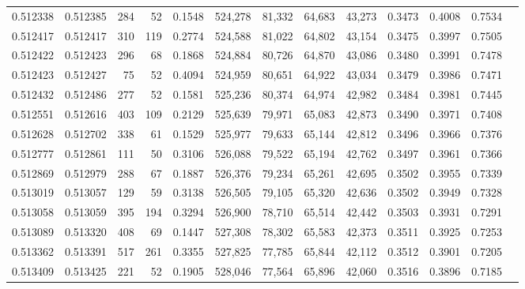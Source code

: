 \begin{tabular}{rrrrrrrrrrrrr}
0.512338 & 0.512385 &   284 &    52 &                                     0.1548 & 524,278 &  81,332 &  64,683 &  43,273 & 0.3473 & 0.4008 & 0.7534 \\
0.512417 & 0.512417 &   310 &   119 &                                     0.2774 & 524,588 &  81,022 &  64,802 &  43,154 & 0.3475 & 0.3997 & 0.7505 \\
0.512422 & 0.512423 &   296 &    68 &                                     0.1868 & 524,884 &  80,726 &  64,870 &  43,086 & 0.3480 & 0.3991 & 0.7478 \\
0.512423 & 0.512427 &    75 &    52 &                                     0.4094 & 524,959 &  80,651 &  64,922 &  43,034 & 0.3479 & 0.3986 & 0.7471 \\
0.512432 & 0.512486 &   277 &    52 &                                     0.1581 & 525,236 &  80,374 &  64,974 &  42,982 & 0.3484 & 0.3981 & 0.7445 \\
0.512551 & 0.512616 &   403 &   109 &                                     0.2129 & 525,639 &  79,971 &  65,083 &  42,873 & 0.3490 & 0.3971 & 0.7408 \\
0.512628 & 0.512702 &   338 &    61 &                                     0.1529 & 525,977 &  79,633 &  65,144 &  42,812 & 0.3496 & 0.3966 & 0.7376 \\
0.512777 & 0.512861 &   111 &    50 &                                     0.3106 & 526,088 &  79,522 &  65,194 &  42,762 & 0.3497 & 0.3961 & 0.7366 \\
0.512869 & 0.512979 &   288 &    67 &                                     0.1887 & 526,376 &  79,234 &  65,261 &  42,695 & 0.3502 & 0.3955 & 0.7339 \\
0.513019 & 0.513057 &   129 &    59 &                                     0.3138 & 526,505 &  79,105 &  65,320 &  42,636 & 0.3502 & 0.3949 & 0.7328 \\
0.513058 & 0.513059 &   395 &   194 &                                     0.3294 & 526,900 &  78,710 &  65,514 &  42,442 & 0.3503 & 0.3931 & 0.7291 \\
0.513089 & 0.513320 &   408 &    69 &                                     0.1447 & 527,308 &  78,302 &  65,583 &  42,373 & 0.3511 & 0.3925 & 0.7253 \\
0.513362 & 0.513391 &   517 &   261 &                                     0.3355 & 527,825 &  77,785 &  65,844 &  42,112 & 0.3512 & 0.3901 & 0.7205 \\
0.513409 & 0.513425 &   221 &    52 &                                     0.1905 & 528,046 &  77,564 &  65,896 &  42,060 & 0.3516 & 0.3896 & 0.7185 \\

\end{tabular}
